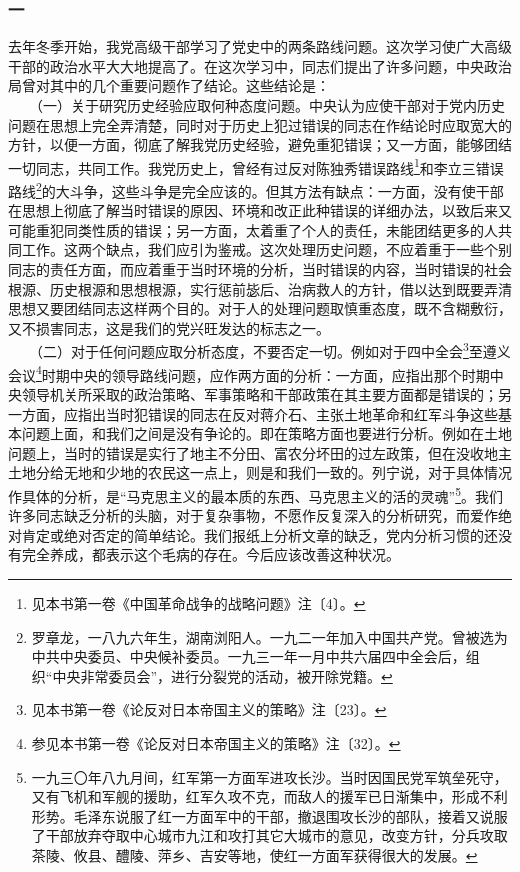\documentclass[cn,11pt,chinese]{elegantbook}
\def\myformat#1{\hfil\hfil #1}
\begin{document}
\subsubsection*{\myformat{一}}
去年冬季开始，我党高级干部学习了党史中的两条路线问题。这次学习使广大高级干部的政治水平大大地提高了。在这次学习中，同志们提出了许多问题，中央政治局曾对其中的几个重要问题作了结论。这些结论是：\\
　　（一）关于研究历史经验应取何种态度问题。中央认为应使干部对于党内历史问题在思想上完全弄清楚，同时对于历史上犯过错误的同志在作结论时应取宽大的方针，以便一方面，彻底了解我党历史经验，避免重犯错误；又一方面，能够团结一切同志，共同工作。我党历史上，曾经有过反对陈独秀错误路线\footnote[1]{ 见本书第一卷《中国革命战争的战略问题》注〔4〕。}和李立三错误路线\footnote[2]{ 罗章龙，一八九六年生，湖南浏阳人。一九二一年加入中国共产党。曾被选为中共中央委员、中央候补委员。一九三一年一月中共六届四中全会后，组织“中央非常委员会”，进行分裂党的活动，被开除党籍。}的大斗争，这些斗争是完全应该的。但其方法有缺点：一方面，没有使干部在思想上彻底了解当时错误的原因、环境和改正此种错误的详细办法，以致后来又可能重犯同类性质的错误；另一方面，太着重了个人的责任，未能团结更多的人共同工作。这两个缺点，我们应引为鉴戒。这次处理历史问题，不应着重于一些个别同志的责任方面，而应着重于当时环境的分析，当时错误的内容，当时错误的社会根源、历史根源和思想根源，实行惩前毖后、治病救人的方针，借以达到既要弄清思想又要团结同志这样两个目的。对于人的处理问题取慎重态度，既不含糊敷衍，又不损害同志，这是我们的党兴旺发达的标志之一。\\
　　（二）对于任何问题应取分析态度，不要否定一切。例如对于四中全会\footnote[3]{ 见本书第一卷《论反对日本帝国主义的策略》注〔23〕。}至遵义会议\footnote[4]{ 参见本书第一卷《论反对日本帝国主义的策略》注〔32〕。}时期中央的领导路线问题，应作两方面的分析：一方面，应指出那个时期中央领导机关所采取的政治策略、军事策略和干部政策在其主要方面都是错误的；另一方面，应指出当时犯错误的同志在反对蒋介石、主张土地革命和红军斗争这些基本问题上面，和我们之间是没有争论的。即在策略方面也要进行分析。例如在土地问题上，当时的错误是实行了地主不分田、富农分坏田的过左政策，但在没收地主土地分给无地和少地的农民这一点上，则是和我们一致的。列宁说，对于具体情况作具体的分析，是“马克思主义的最本质的东西、马克思主义的活的灵魂”\footnote[5]{ 一九三〇年八九月间，红军第一方面军进攻长沙。当时因国民党军筑垒死守，又有飞机和军舰的援助，红军久攻不克，而敌人的援军已日渐集中，形成不利形势。毛泽东说服了红一方面军中的干部，撤退围攻长沙的部队，接着又说服了干部放弃夺取中心城市九江和攻打其它大城市的意见，改变方针，分兵攻取茶陵、攸县、醴陵、萍乡、吉安等地，使红一方面军获得很大的发展。}。我们许多同志缺乏分析的头脑，对于复杂事物，不愿作反复深入的分析研究，而爱作绝对肯定或绝对否定的简单结论。我们报纸上分析文章的缺乏，党内分析习惯的还没有完全养成，都表示这个毛病的存在。今后应该改善这种状况。\\
\end{document}
